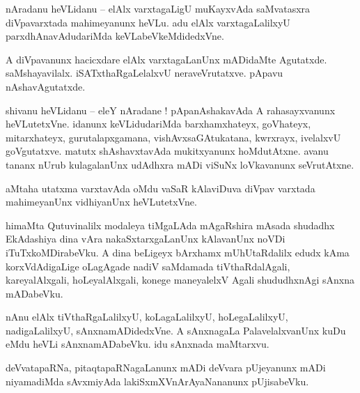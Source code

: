 \documentclass{article}
\begin{document}


\begin{mn}%
nAradanu heVLidanu -- elAlx varxtagaLigU muKayxvAda saMvatasxra diVpavarxtada mahimeyanunx heVLu. 
adu elAlx varxtagaLalilxyU parxdhAnavAdudariMda keVLabeVkeMdidedxVne.
\end{mn}

\begin{mn}%
A diVpavanunx hacicxdare elAlx varxtagaLanUnx mADidaMte Agutatxde. saMshayavilalx. 
iSATxthaRgaLelalxvU neraveVrutatxve. pApavu nAshavAgutatxde.
\end{mn}

\begin{mn}%
shivanu heVLidanu -- eleY nAradane ! pApanAshakavAda A rahasayxvanunx heVLutetxVne. idanunx 
keVLidudariMda barxhamxhateyx, goVhateyx,  mitarxhateyx, gurutalapxgamana, vishAvxsaGAtukatana, 
kwrxrayx, ivelalxvU goVgutatxve. matutx shAshavxtavAda mukitxyanunx hoMdutAtxne. avanu tananx nUrub 
kulagalanUnx udAdhxra mADi viSuNx loVkavanunx seVrutAtxne.
\end{mn}

\begin{mn}%
aMtaha utatxma varxtavAda oMdu vaSaR kAlaviDuva diVpav varxtada mahimeyanUnx vidhiyanUnx heVLutetxVne.
\end{mn}

\begin{mn}%
himaMta Qutuvinalilx modaleya tiMgaLAda mAgaRshira mAsada shudadhx EkAdashiya dina vAra 
nakaSxtarxgaLanUnx kAlavanUnx noVDi iTuTxkoMDirabeVku. A dina beLigeyx bArxhamx mUhUtaRdalilx edudx 
kAma korxVdAdigaLige oLagAgade nadiV saMdamada tiVthaRdalAgali, kareyalAlxgali, hoLeyalAlxgali, 
konege maneyalelxV Agali shududhxnAgi sAnxna mADabeVku.
\end{mn}

\begin{mn}%
nAnu elAlx tiVthaRgaLalilxyU, koLagaLalilxyU, hoLegaLalilxyU, nadigaLalilxyU, sAnxnamADidedxVne. A 
sAnxnagaLa PalavelalxvanUnx kuDu eMdu heVLi sAnxnamADabeVku. idu sAnxnada maMtarxvu.
\end{mn}

\begin{mn}%
deVvatapaRNa, pitaqtapaRNagaLanunx mADi deVvara pUjeyanunx mADi niyamadiMda sAvxmiyAda 
lakiSxmXVnArAyaNananunx pUjisabeVku.
\end{mn}
\end{document}
